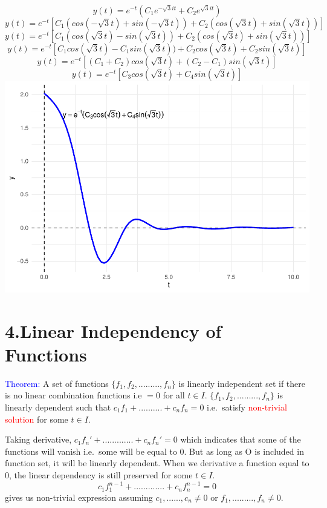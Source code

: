 \documentclass[
  11pt,
]{article}
\begin{document}
\[y(t)=e^{-t}(C_1e^{- \sqrt{3}it}+C_2e^{\sqrt{3}it})\]
\[y(t)=e^{-t}[C_1(cos(-\sqrt{3}t)+sin(-\sqrt{3}t))+C_2(cos(\sqrt{3}t)+sin(\sqrt{3}t))]\]
\[
y(t)=e^{-t}[C_1(cos(\sqrt{3}t)-sin(\sqrt{3}t))+C_2(cos(\sqrt{3}t)+sin(\sqrt{3}t))]
\] \[
y(t)=e^{-t}[C_1cos(\sqrt{3}t)-C_1sin(\sqrt{3}t))+C_2cos(\sqrt{3}t)+C_2sin(\sqrt{3}t)]
\] \[y(t)=e^{-t}[(C_1+C_2)cos(\sqrt{3}t)+(C_2-C_1)sin(\sqrt{3}t)]\] \[
y(t)=e^{-t}[C_3cos(\sqrt{3}t)+C_4sin(\sqrt{3}t)] \tag{2}
\] \includegraphics{differential_files/figure-latex/difference7-1.pdf}
\newpage

\section{4.Linear Independency of
Functions}\label{linear-independency-of-functions}

\textcolor{blue}{Theorem:} A set of functions
\(\{f_1,f_2,.........,f_n\}\) is linearly independent set if there is no
linear combination functions i.e \(=0\) for all \(t \in I\).
\(\{f_1,f_2,.........,f_n\}\) is linearly dependent such that
\(c_1f_1+..........+c_nf_n=0\) i.e.~satisfy
\textcolor{red}{non-trivial solution} for some \(t \in I\).

Taking derivative, \(c_1f_n'+.............+c_nf_n'=0\) which indicates
that some of the functions will vanish i.e.~some will be equal to 0. But
as long as O is included in function set, it will be linearly dependent.
When we derivative a function equal to 0, the linear dependency is still
preserved for some \(t \in I\).
\[c_1f_1^{n-1}+.............+c_nf_n^{n-1}=0\] gives us non-trivial
expression assuming \(c_1,......,c_n \neq 0\) or
\(f_1,.........,f_n \neq 0\).
\end{document}
